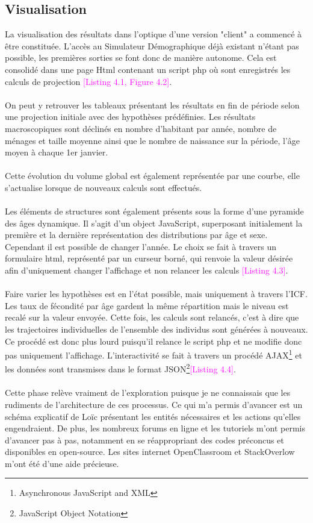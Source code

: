 \documentclass{bredele}
\begin{document}
\subsection{Visualisation}
La visualisation des résultats dans l'optique d'une version "client" a commencé à être constituée. L'accès au Simulateur Démographique déjà existant n'étant pas possible, les premières sorties se font donc de manière autonome. Cela est consolidé dans une page Html contenant un script php où sont enregistrés les calculs de projection \textcolor{magenta}{[Listing 4.1, Figure 4.2]}.
\\\\On peut y retrouver les tableaux présentant les résultats en fin de période selon une projection initiale avec des hypothèses prédéfinies. Les résultats macroscopiques sont déclinés en nombre d'habitant par année, nombre de ménages et taille moyenne ainsi que le nombre de naissance sur la période, l'âge moyen à chaque 1er janvier.
\\\\Cette évolution du volume global est également représentée par une courbe, elle s'actualise lorsque de nouveaux calculs sont effectués.
\\\\Les éléments de structures sont également présents sous la forme d'une pyramide des âges dynamique. Il s'agit d'un object JavaScript, superposant initialement la première et la dernière représentation des distributions par âge et sexe. Cependant il est possible de changer l'année. Le choix se fait à travers un formulaire html, représenté par un curseur borné, qui renvoie la valeur désirée afin d'uniquement changer l'affichage et non relancer les calculs \textcolor{magenta}{[Listing 4.3]}.
\\\\Faire varier les hypothèses est en l'état possible, mais uniquement à travers l'ICF. Les taux de fécondité par âge gardent la même répartition mais le niveau est recalé sur la valeur envoyée. Cette fois, les calculs sont relancés, c'est à dire que les trajectoires individuelles de l'ensemble des individus sont générées à nouveaux. Ce procédé est donc plus lourd puisqu'il relance le script php et ne modifie donc pas uniquement l'affichage. L'interactivité se fait à travers un procédé AJAX\footnote{Asynchronous JavaScript and XML} et les données sont transmises dans le format JSON\footnote{JavaScript Object Notation}\textcolor{magenta}{[Listing 4.4]}.\\\\
Cette phase relève vraiment de l'exploration puisque je ne connaissais que les rudiments de l'architecture de ces processus. Ce qui m'a permis d'avancer est un schéma explicatif de Loïc présentant les entités nécessaires et les actions qu'elles engendraient. De plus, les nombreux forums en ligne et les tutoriels m'ont permis d'avancer pas à pas, notamment en se réappropriant des codes préconcus et disponibles en open-source. Les sites internet OpenClassroom et StackOverlow m'ont été d'une aide précieuse.
\clearemptydoublepage
\end{document}
